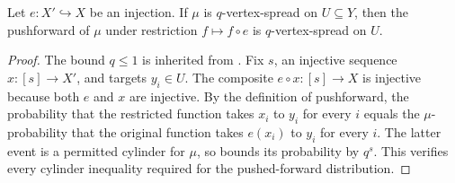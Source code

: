\begin{lemma}
Let $e:X'\hookrightarrow X$ be an injection.  If $\mu$ is $q$-vertex-spread on $U\subseteq Y$, then the pushforward of $\mu$ under restriction $f\mapsto f\circ e$ is $q$-vertex-spread on $U$.
\end{lemma}
\begin{proof}
The bound $q\leq1$ is inherited from .  Fix $s$, an injective sequence $x:[s]\to X'$, and targets $y_i\in U$.  The composite $e\circ x:[s]\to X$ is injective because both $e$ and $x$ are injective.  By the definition of pushforward, the probability that the restricted function takes $x_i$ to $y_i$ for every $i$ equals the $\mu$-probability that the original function takes $e(x_i)$ to $y_i$ for every $i$.  The latter event is a permitted cylinder for $\mu$, so  bounds its probability by $q^s$.  This verifies every cylinder inequality required for the pushed-forward distribution.
\end{proof}
